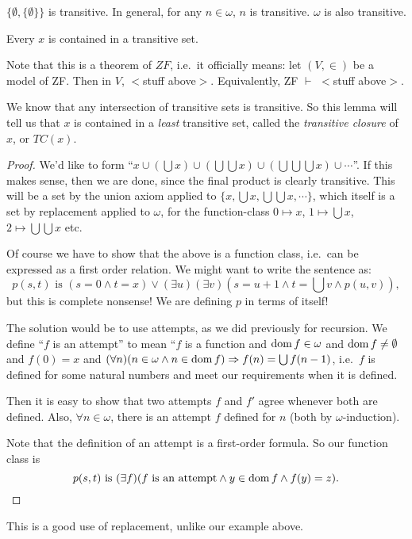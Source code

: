 \documentclass[a4paper]{article}
\begin{document}
\begin{eg}
  $\{\emptyset, \{\emptyset\}\}$ is transitive. In general, for any $n\in \omega$, $n$ is transitive. $\omega$ is also transitive.
\end{eg}

\begin{lemma}
  Every $x$ is contained in a transitive set.
\end{lemma}
Note that this is a theorem of $ZF$, i.e.\ it officially means: let $(V, \in)$ be a model of ZF. Then in $V$, $<$stuff above$>$. Equivalently, ZF $\vdash$ $<$stuff above$>$.

We know that any intersection of transitive sets is transitive. So this lemma will tell us that $x$ is contained in a \emph{least} transitive set, called the \emph{transitive closure} of $x$, or $TC(x)$.

\begin{proof}
  We'd like to form ``$x\cup (\bigcup x)\cup (\bigcup\bigcup x)\cup (\bigcup\bigcup\bigcup x)\cup \cdots$''. If this makes sense, then we are done, since the final product is clearly transitive. This will be a set by the union axiom applied to $\{x, \bigcup x, \bigcup\bigcup x, \cdots\}$, which itself is a set by replacement applied to $\omega$, for the function-class $0\mapsto x$, $1\mapsto \bigcup x$, $2\mapsto \bigcup\bigcup x$ etc.

  Of course we have to show that the above is a function class, i.e.\ can be expressed as a first order relation. We might want to write the sentence as:
  \[
    p(s, t)\text{ is }(s = 0\wedge t = x)\vee (\exists u)(\exists v)(s = u + 1\wedge t = \textstyle{\bigcup} v \wedge p(u, v)),
  \]
  but this is complete nonsense! We are defining $p$ in terms of itself!

  The solution would be to use attempts, as we did previously for recursion. We define ``$f$ is an attempt'' to mean ``$f$ is a function and $\operatorname{dom} f\in \omega$ and $\operatorname{dom} f\not=\emptyset$ and $f(0) = x$ and $(\forall n)(n\in \omega \wedge n\in \operatorname{dom} f)\Rightarrow f(n) = \bigcup f(n - 1)$, i.e.\ $f$ is defined for some natural numbers and meet our requirements when it is defined.

  Then it is easy to show that two attempts $f$ and $f'$ agree whenever both are defined. Also, $\forall n\in \omega$, there is an attempt $f$ defined for $n$ (both by $\omega$-induction).

  Note that the definition of an attempt is a first-order formula. So our function class is
  \[
    p(s, t)\text{ is } (\exists f)(f\text{ is an attempt}\wedge y\in \operatorname{dom} f \wedge f(y) = z).\qedhere
  \]
\end{proof}
This is a good use of replacement, unlike our example above.
\end{document}
